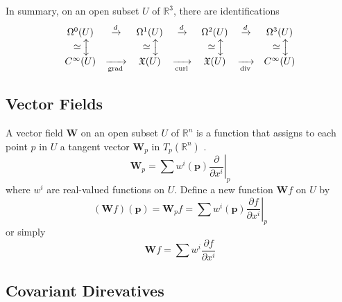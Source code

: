 \documentclass{article}
\newcommand{\longupdownarrow}{{\mbox{\rotatebox[origin=c]{-90}{$\longleftrightarrow$}}}}
\newcommand{\tmmathbf}[1]{\ensuremath{\boldsymbol{#1}}}
\newcommand{\tmop}[1]{\ensuremath{\operatorname{#1}}}
\begin{document}
In summary, on an open subset $U$ of $\mathbb{R}^3$, there are identifications
\[ \begin{array}{ccccccc}
     \Omega^0 (U) & \xrightarrow{d} & \Omega^1 (U) & \xrightarrow{d} &
     \Omega^2 (U) & \xrightarrow{d} & \Omega^3 (U)\\
     \simeq \longupdownarrow &  & \simeq \longupdownarrow &  & \simeq
     \longupdownarrow &  & \simeq \longupdownarrow\\
     C^{\infty} (U) & \xrightarrow[\tmop{grad}]{} & \mathfrak{X} (U) &
     \xrightarrow[\tmop{curl}]{} & \mathfrak{X} (U) &
     \xrightarrow[\tmop{div}]{} & C^{\infty} (U)
   \end{array} \]

\subsection{Vector Fields}

A vector field $\tmmathbf{W}$ on an open subset $U$ of $\mathbb{R}^n$ is a
function that assigns to each point $p$ in $U$ a tangent vector
$\tmmathbf{W}_p$ in $T_p (\mathbb{R}^n)$ {\cite{tu2010introduction}}.
\begin{equation}
  \tmmathbf{W}_p = \sum w^i (\mathbf{p}) \left. \frac{\partial}{\partial x^i}
  \right|_p
\end{equation}
where $w^i$ are real-valued functions on $U$. Define a new function
$\tmmathbf{W}f$ on $U$ by
\begin{equation}
  (\tmmathbf{W}f) (\mathbf{p}) =\tmmathbf{W}_p f = \sum w^i (\mathbf{p})
  \left. \frac{\partial f}{\partial x^i} \right|_p
\end{equation}
or simply
\begin{equation}
  \tmmathbf{W}f = \sum w^i \frac{\partial f}{\partial x^i}
\end{equation}

\subsection{Covariant Direvatives}
\end{document}
